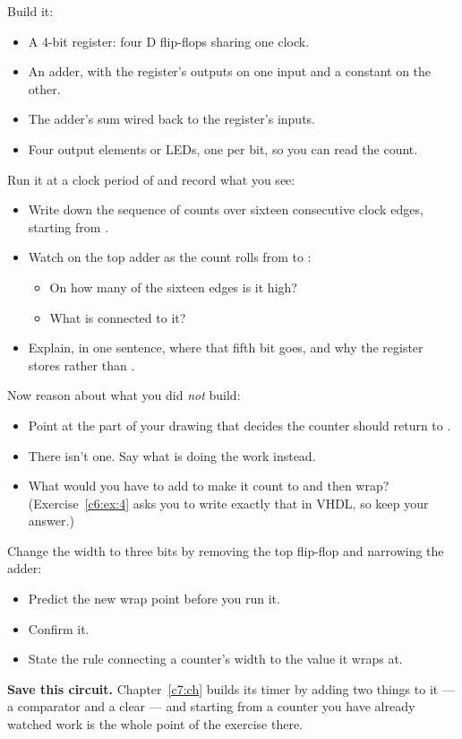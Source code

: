 \begin{parts}
  \item Build it:
    \begin{itemize}
      \item A 4-bit register: four D flip-flops sharing one clock.
      \item An adder, with the register's outputs on one input and a constant  on the
        other.
      \item The adder's sum wired back to the register's  inputs.
      \item Four output elements or LEDs, one per bit, so you can read the count.
    \end{itemize}
  \item Run it at a clock period of  and record what you see:
    \begin{itemize}
      \item Write down the sequence of counts over sixteen consecutive clock edges, starting from
        .
      \item Watch  on the top adder as the count rolls from  to
        :
        \begin{itemize}
          \item On how many of the sixteen edges is it high?
          \item What is connected to it?
        \end{itemize}
      \item Explain, in one sentence, where that fifth bit goes, and why the register stores
         rather than .
    \end{itemize}
  \item Now reason about what you did \emph{not} build:
    \begin{itemize}
      \item Point at the part of your drawing that decides the counter should return to
        .
      \item There isn't one. Say what is doing the work instead.
      \item What would you have to add to make it count  to  and then wrap?
        (Exercise~\ref{c6:ex:4} asks you to write exactly that in VHDL, so keep your answer.)
    \end{itemize}
  \item Change the width to three bits by removing the top flip-flop and narrowing the adder:
    \begin{itemize}
      \item Predict the new wrap point before you run it.
      \item Confirm it.
      \item State the rule connecting a counter's width to the value it wraps at.
    \end{itemize}
\end{parts}
\textbf{Save this circuit.} Chapter~\ref{c7:ch} builds its timer by adding two things to it --- a
comparator and a clear --- and starting from a counter you have already watched work is the whole
point of the exercise there.


